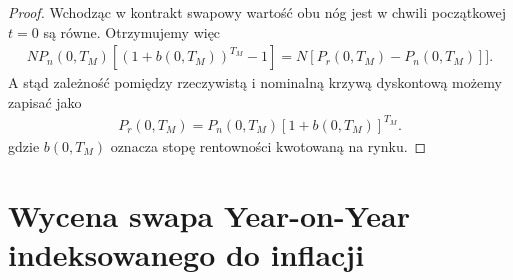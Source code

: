 \documentclass{mini}
\theoremstyle{mythstyle}
\begin{document}
	\begin{proof}
		Wchodząc w kontrakt swapowy wartość obu nóg jest w chwili początkowej $t = 0$ są równe. Otrzymujemy więc
		\begin{eqnarray*}
			N P_n(0,T_M)[(1 + b(0,T_M))^{T_M} - 1] = N [P_r(0,T_M) - P_n(0,T_M)]].
		\end{eqnarray*}
		A stąd zależność pomiędzy rzeczywistą i nominalną krzywą dyskontową możemy zapisać jako
		\begin{eqnarray}
		P_r(0,T_M) = P_n(0,T_M)[1 + b(0,T_M)]^{T_M}.
		\end{eqnarray}
		gdzie $b(0,T_M)$ oznacza stopę rentowności kwotowaną na rynku.
	\end{proof}

	\section{Wycena swapa Year-on-Year indeksowanego do inflacji}
		
\end{document}

